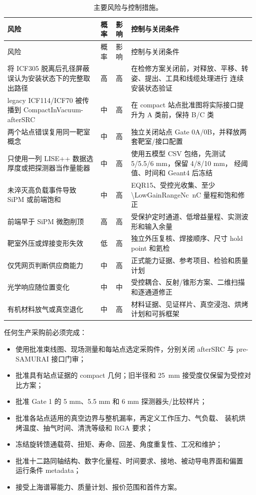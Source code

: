 \documentclass[UTF8,10pt,letterpaper,fontset=none]{ctexart}
\begin{document}
\begin{longtable}{L{0.27\textwidth}C{0.10\textwidth}C{0.10\textwidth}L{0.37\textwidth}}
  \caption{主要风险与控制措施。}\\
  \toprule
  风险 & 概率 & 影响 & 控制与关闭条件 \\
  \midrule
  \endfirsthead
  \toprule
  风险 & 概率 & 影响 & 控制与关闭条件 \\
  \midrule
  \endhead
  将 ICF305 脱离后孔径屏蔽误认为安装状态下的完整取出路径 &
    高 & 高 & 在检修方案关闭前，对释放、平移、转姿、提出、工具和线缆处理进行
    连续安装状态验证 \\
  legacy ICF114/ICF70 被传播到 CompactInVacuum-afterSRC &
    中 & 高 & 在 compact 站点批准图将实际接口提升为 A 类前，保持 B/C 类 \\
  两个站点错误复用同一靶室概念 &
    中 & 高 & 独立关闭站点 Gate 0A/0B，并释放两套靶室/接口配置 \\
  只使用一列 LISE++ 数据选厚度或把探测器当作量能器 &
    中 & 高 & 使用五模型 CSV 包络，先测试 5/5.5/6 mm，保留 4/8/10 mm，
    经阈值、时间和 Geant4 后冻结 \\
  未淬灭高负载事件导致 SiPM 或前端饱和 &
    中 & 高 & EQR15、受控光收集、至少
    \SI{\LowGainRangeNc}{\nano\coulomb} 量程和饱和修正 \\
  前端早于 SiPM 微胞削顶 &
    高 & 高 & 受保护定时通道、低增益量程、实测波形和输入余量 \\
  靶室外压或焊接变形失效 &
    低 & 高 & 独立外压复核、焊接顺序、尺寸 hold point 和氦检 \\
  仅凭网页判断供应商能力 &
    中 & 高 & 正式能力证据、参考项目、检验和质量计划 \\
  光学响应随位置变化 &
    中 & 中 & 受控耦合、反射/锥形方案、二维扫描和逐通道修正 \\
  有机材料放气或真空退化 &
    中 & 高 & 材料证据、见证样片、真空浸泡、烘烤计划和可拆框架 \\
  \bottomrule
\end{longtable}

任何生产采购前必须完成：
\begin{itemize}
  \item 使用批准束线图、现场测量和每站点选定采购件，分别关闭 afterSRC 与
    pre-SAMURAI 接口门审；
  \item 批准具有站点证据的 compact 几何；旧半径和
    \SI{25}{\milli\meter} 接受度仅保留为受控对比方案；
  \item 批准 Gate 1 的 5 mm、5.5 mm 和 6 mm 探测器头/比较样片；
  \item 批准各站点适用的真空边界与整机漏率，再定义工作压力、气负载、
    装机烘烤温度、抽气时间、清洗等级和 RGA 要求；
  \item 冻结旋转馈通载荷、扭矩、寿命、回差、角度重复性、工况和维护；
  \item 批准十二路同轴结构、数字化量程、时间要求、接地、被动导电界面和偏置
    运行条件 metadata；
  \item 接受上海谱幂能力、质量计划、报价范围和首件方案。
\end{itemize}
\end{document}
